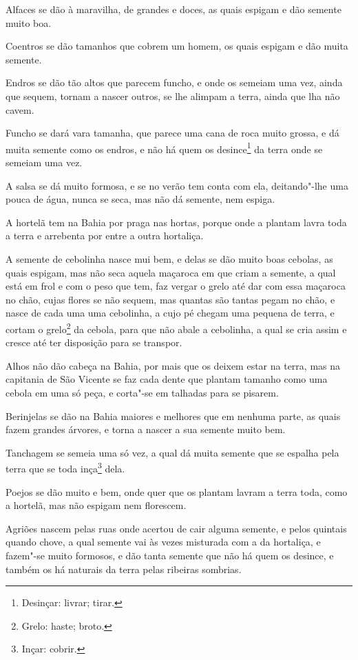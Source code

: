 \begin{linenumbers}
Alfaces se dão à maravilha, de grandes e doces, as quais espigam e dão semente muito boa.

Coentros se dão tamanhos que cobrem um homem, os quais espigam e dão muita semente.

Endros se dão tão altos que parecem funcho, e onde os semeiam uma vez, ainda que sequem,
tornam a nascer outros, se lhe alimpam a terra, ainda que lha não cavem.

Funcho se dará vara tamanha, que parece uma cana de roca muito grossa, e dá muita semente
como os endros, e não há quem os desince\footnote{ Desinçar: livrar; tirar.} da terra onde
se semeiam uma vez.

A salsa se dá muito formosa, e se no verão tem conta com ela, deitando"-lhe uma pouca de
água, nunca se seca, mas não dá semente, nem espiga.

A hortelã tem na Bahia por praga nas hortas, porque onde a plantam lavra toda a terra e
arrebenta por entre a outra hortaliça.

A semente de cebolinha nasce mui bem, e delas se dão muito boas cebolas, as quais espigam,
mas não seca aquela maçaroca em que criam a semente, a qual está em frol e com o peso que
tem, faz vergar o grelo até dar com essa maçaroca no chão, cujas flores se não sequem, mas
quantas são tantas pegam no chão, e nasce de cada uma uma cebolinha, a cujo pé chegam uma
pequena de terra, e cortam o grelo\footnote{ Grelo: haste; broto.} da cebola, para que não
abale a cebolinha, a qual se cria assim e cresce até ter disposição para se transpor.

Alhos não dão cabeça na Bahia, por mais que os deixem estar na terra, mas na capitania de
São Vicente se faz cada dente que plantam tamanho como uma cebola em uma só peça, e
corta"-se em talhadas para se pisarem.

Berinjelas se dão na Bahia maiores e melhores que em nenhuma parte, as quais fazem grandes
árvores, e torna a nascer a sua semente muito bem.

Tanchagem se semeia uma só vez, a qual dá muita semente que se espalha pela terra que se
toda inça\footnote{ Inçar: cobrir.} dela.


Poejos se dão muito e bem, onde quer que os plantam lavram a terra toda, como a hortelã,
mas não espigam nem florescem.

Agriões nascem pelas ruas onde acertou de cair alguma semente, e pelos quintais quando
chove, a qual semente vai às vezes misturada com a da hortaliça, e fazem"-se muito
formosos, e dão tanta semente que não há quem os desince, e também os há naturais da terra
pelas ribeiras sombrias.


\end{linenumbers}
